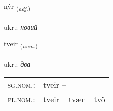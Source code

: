 \documentclass[frontgrid, backgrid]{flacards}\usepackage[]{graphicx}\usepackage[]{xcolor}
\begin{document}
{nýr \small{\textsubscript{(\textit{adj.})}} \\[1ex] %
\textphonetic{[niːr]} \\
ukr.: \emph{новий} \\  [2ex]
\renewcommand*{\arraystretch}{0.8}
}

\renewcommand{\flhead}{\vskip5pt \fboxsep=0pt {\small\bfseries\footnotesize Töluorð | чисельник}}
\renewcommand{\fcfoot}{\vskip5pt \fboxsep=0pt \hspace{2pt}{\small\bfseries\footnotesize 1K}}

\renewcommand{\blhead}{\vskip5pt {\small\bfseries\footnotesize Töluorð | чисельник }}
\renewcommand{\bcfoot}{\vskip5pt \hspace{2pt}{\small\bfseries\footnotesize 1K}}


{tveir \small{\textsubscript{(\textit{num.})}} \\[1ex] %
\textphonetic{[tʰveiːr]} \\
ukr.: \emph{два} \\  [2ex]
\renewcommand*{\arraystretch}{0.8}
\begin{tabular}{ll}
\textsc{sg.nom.}: & tveir  -- \\ 
\textsc{pl.nom.}: & tveir -- tvær -- tvö
\end{tabular}
}

\renewcommand{\flhead}{\vskip5pt \fboxsep=0pt {\small\bfseries\footnotesize Sagnorð | дієслово}}
\renewcommand{\fcfoot}{\vskip5pt \fboxsep=0pt \hspace{2pt}{\small\bfseries\footnotesize 1K}}

\renewcommand{\blhead}{\vskip5pt {\small\bfseries\footnotesize Sagnorð | дієслово }}
\renewcommand{\bcfoot}{\vskip5pt \hspace{2pt}{\small\bfseries\footnotesize 1K}}
\end{document}
